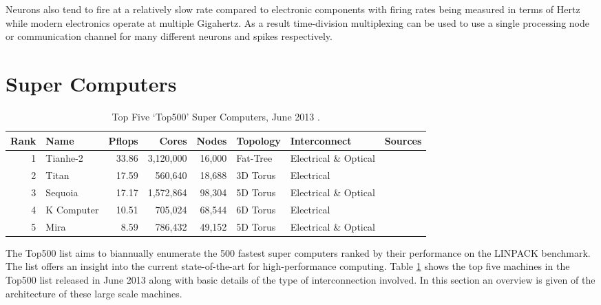 			Neurons also tend to fire at a relatively slow rate compared to electronic
			components with firing rates being measured in terms of Hertz while modern
			electronics operate at multiple Gigahertz. As a result time-division
			multiplexing can be used to use a single processing node or communication
			channel for many different neurons and spikes respectively.
	
	
	\section{Super Computers}
		
		\label{sec:super-computers}
		
		\begin{table}
			\center
			\begin{tabular}{r l r r r l l l}
				\toprule
				Rank & Name    & Pflops& Cores  & Nodes  & Topology & Interconnect          & Sources \\
				\midrule                          
				1 & Tianhe-2   & 33.86 & 3,120,000 & 16,000 & Fat-Tree & Electrical \& Optical & \cite{dongarra13} \\
				2 & Titan      & 17.59 & 560,640   & 18,688 & 3D Torus & Electrical            & \cite{bland12} \\
				3 & Sequoia    & 17.17 & 1,572,864 & 98,304 & 5D Torus & Electrical \& Optical & \cite{prickett10} \\
				4 & K Computer & 10.51 & 705,024   & 68,544 & 6D Torus & Electrical            & \cite{fujitsu11,yokokawa11} \\
				5 & Mira       &  8.59 & 786,432   & 49,152 & 5D Torus & Electrical \& Optical & \cite{prickett10} \\
				\bottomrule
			\end{tabular}
			
			\caption{Top Five `Top500' Super Computers, June 2013 \cite{meuer13}.}
			\label{tab:top500}
		\end{table}
		
		The Top500 list \cite{meuer13} aims to biannually enumerate the 500 fastest
		super computers ranked by their performance on the LINPACK
		\cite{dongarraLINPAC} benchmark. The list offers an insight into the current
		state-of-the-art for high-performance computing. Table \ref{tab:top500}
		shows the top five machines in the Top500 list released in June 2013 along
		with basic details of the type of interconnection involved. In this section
		an overview is given of the architecture of these large scale machines.
		
